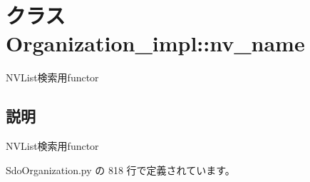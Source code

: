 \section{クラス Organization\_\-impl::nv\_\-name}
\label{classsource__py_1_1_sdo_organization_1_1_organization__impl_1_1nv__name}
NVList検索用functor  




\subsection{説明}
NVList検索用functor 

 SdoOrganization.py の 818 行で定義されています。